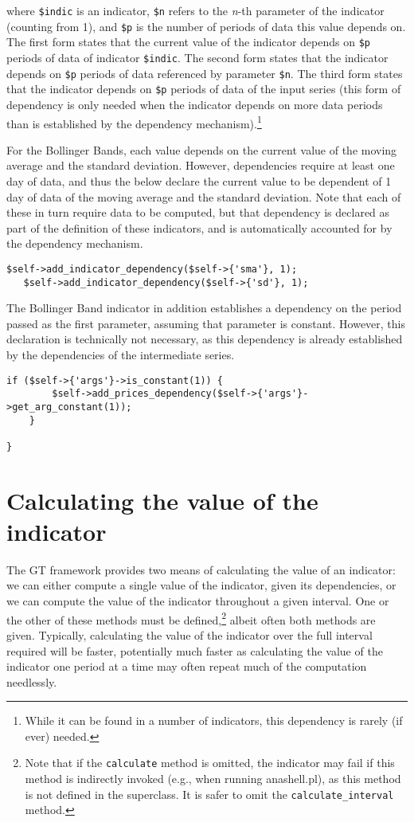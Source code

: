 \documentclass[11pt,twoside]{article}
\begin{document}
where \lstinline!$indic! is an indicator,
\lstinline!$n! refers to the \textit{n}-th parameter of the
indicator (counting from 1), and \lstinline!$p! is the number
of periods of data this value depends on. The first form states that
the current value of the indicator depends on \lstinline!$p!
periods of data of indicator \lstinline!$indic!. The second
form states that the indicator depends on \lstinline!$p!
periods of data referenced by parameter \lstinline!$n!. The
third form states that the indicator depends on \lstinline!$p!
periods of data of the input series (this form of dependency is only
needed when the indicator depends on more data periods than is
established by the dependency mechanism).\footnote{While it can be
found in a number of indicators, this dependency is rarely (if ever)
needed.}

For the Bollinger Bands, each value depends on the current value of the
moving average and the standard deviation. However, dependencies
require at least one day of data, and thus the below declare the
current value to be dependent of 1 day of data of the moving average
and the standard deviation. Note that each of these in turn require
data to be computed, but that dependency is declared as part of the
definition of these indicators, and is automatically accounted for by
the dependency mechanism.

\begin{lstlisting}[name=example]
   $self->add_indicator_dependency($self->{'sma'}, 1);
   $self->add_indicator_dependency($self->{'sd'}, 1);
\end{lstlisting}
The Bollinger Band indicator in addition establishes a dependency on the
period passed as the first parameter, assuming that parameter is
constant. However, this declaration is technically not necessary, as
this dependency is already established by the dependencies of the
intermediate series.

\begin{lstlisting}[name=example]
    if ($self->{'args'}->is_constant(1)) {
        $self->add_prices_dependency($self->{'args'}->get_arg_constant(1));
    }

}
\end{lstlisting}
\section{Calculating the value of the indicator}
The GT framework provides two means of calculating the value of an
indicator: we can either compute a single value of the indicator, given
its dependencies, or we can compute the value of the indicator
throughout a given interval. One or the other of these methods must be
defined,\footnote{Note that if the \lstinline!calculate!
method is omitted, the indicator may fail if this method is indirectly
invoked (e.g., when running anashell.pl), as this method is not defined
in the superclass. It is safer to omit the
\lstinline!calculate_interval! method.} albeit often both
methods are given. Typically, calculating the value of the indicator
over the full interval required will be faster, potentially much faster
as calculating the value of the indicator one period at a time may
often repeat much of the computation needlessly.
\end{document}
